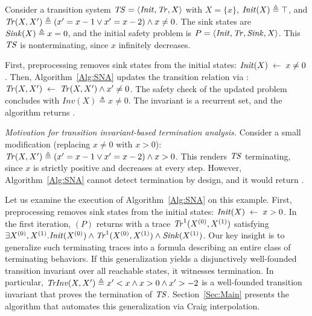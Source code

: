 \begin{example}\label{Ex:SNA}
    Consider a transition system $\mathit{TS} = \langle \mathit{Init}, \mathit{Tr}, X \rangle$ with 
    $X = \{x\}$, $\mathit{Init}(X)   \triangleq \top$, and
    $\mathit{Tr}(X, X') \triangleq (x' = x - 1 \lor x' = x - 2) \land x \neq 0$.
    The sink states are $\mathit{Sink}(X) \triangleq x = 0$, and the initial 
    safety problem is $P = \langle \mathit{Init}, \mathit{Tr}, \mathit{Sink}, X \rangle$.
    This $\mathit{TS}$ is nonterminating, since $x$ infinitely decreases.

    First, preprocessing removes sink states from the initial states: $\mathit{Init}(X) \;\gets\; x \neq 0$.
    Then, Algorithm~\ref{Alg:SNA} updates the transition relation via \blockTerm:
    $\mathit{Tr}(X, X') \;\gets\; \mathit{Tr}(X, X') \land x' \neq 0$.
    The safety check of the updated problem concludes \SAFE{}
    with $Inv(X) \triangleq x \neq 0$.
    The invariant is a recurrent set, and the algorithm returns \NONTERM.

    \textit{Motivation for transition invariant-based termination analysis.} Consider a 
    small modification (replacing $x\neq0$ with $x>0$): $\mathit{Tr}(X, X') \triangleq 
    (x' = x - 1 \lor x' = x - 2) \land x > 0$. 
    This renders $\mathit{TS}$ terminating, since $x$ is strictly positive and decreases at every step.
    However, Algorithm~\ref{Alg:SNA} cannot detect termination by design, and 
    it would return \UNKNOWN. 

    Let us examine the execution of Algorithm~\ref{Alg:SNA} on this example.
    First, preprocessing removes sink states from the initial states:
    $\mathit{Init}(X) \;\gets\; x > 0$.
    In the first iteration, \safetyCheck$(P)$ returns \UNSAFE{} with a 
    trace $\mathit{Tr}^1(X^{(0)}, X^{(1)})$ satisfying $\exists X^{(0)}, X^{(1)}. 
    \mathit{Init}(X^{(0)}) \land \mathit{Tr}^1(X^{(0)}, X^{(1)}) \land \mathit{Sink}(X^{(1)})$.
    Our key insight is to generalize such terminating traces into a formula describing an
    entire class of terminating behaviors.
    If this generalization yields a disjunctively well-founded 
    transition invariant over all reachable states, it witnesses 
    termination.
    In particular, $\mathit{TrInv}(X, X') \triangleq x' < x \land x > 0 \land x' > -2$ is a well-founded transition 
    invariant that proves the termination of $\mathit{TS}$.
    Section~\ref{Sec:Main} presents the algorithm that automates this generalization via
    Craig interpolation.
\end{example}